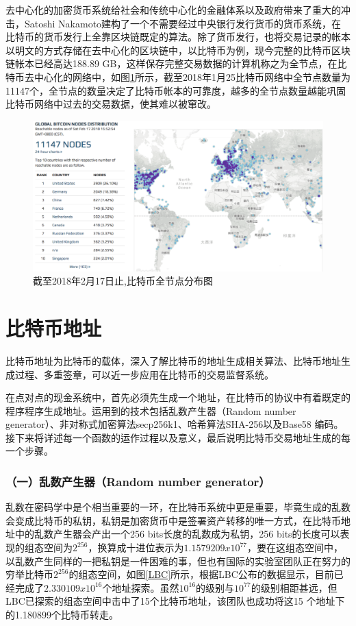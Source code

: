 		去中⼼化的加密货币系统给社会和传统中⼼化的⾦融体系以及政府带来了重⼤的冲击，Satoshi Nakamoto建构了一个不需要经过中央银行发行货币的货币系统，在比特币的货币发行上全靠区块链既定的算法。除了货币发行，也将交易记录的帐本以明文的方式存储在去中心化的区块链中，以比特币为例，现今完整的比特币区块链帐本已经高达188.89 GB，这样保存完整交易数据的计算机称之为全节点，在比特币去中心化的网络中，如图\ref{bitcoinfullnode}所示，截至2018年1月25比特币网络中全节点数量为11147个\supercite{bitcoinfullnode}，全节点的数量决定了比特币帐本的可靠度，越多的全节点数量越能巩固⽐特币网络中过去的交易数据，使其难以被窜改。

		\begin{figure}
			\centering
			\includegraphics[width = .9\textwidth]{bitcoinfullnode.pdf}
			\caption{截至2018年2月17日止,⽐特币全节点分布图\supercite{bitcoinfullnode}}\label{bitcoinfullnode}
		\end{figure}


		\section{比特币地址}
		⽐特币地址为⽐特币的载体，深⼊了解⽐特币的地址⽣成相关算法、⽐特币地址⽣成过程、多重签章，可以近⼀步应⽤在比特币的交易监督系统。
		
		在点对点的现金系统中，首先必须先生成一个地址，在比特币的协议中有着既定的程序程序生成地址。运用到的技术包括乱数产生器（Random number generator）、非对称式加密算法secp256k1\supercite{johnson2001elliptic}、哈希算法SHA-256\supercite{DBLP:conf/fse/KhovratovichRS12}以及Base58 编码\supercite{Base58}。接下来将详述每一个函数的运作过程以及意义，最后说明比特币交易地址生成的每一个步骤。
			
				\subsubsection{（一）乱数产生器（Random number generator）}
				乱数在密码学中是个相当重要的一环，在比特币系统中更是重要，毕竟生成的乱数会变成比特币的私钥，私钥是加密货币中是签署资产转移的唯一方式，在比特币地址中的乱数产生器会产出一个256 bits长度的乱数成为私钥，256 bits的长度可以表现的组态空间为$2^{256}$，换算成十进位表示为$1.1579209x10^{77}$，要在这组态空间中，以乱数产生同样的一把私钥是一件困难的事，但也有国际的实验室\supercite{TheLargeBitcoinCollider}团队正在努力的穷举比特币$2^{256}$的组态空间，如图\ref{LBC}所示，根据LBC公布的数据显示，目前已经完成了$2.330109x10^{16}$个地址探索。虽然$10^{16}$的级别与$10^{77}$的级别相距甚远，但LBC已探索的组态空间中击中了15个比特币地址，该团队也成功将这15 个地址下的1.180899个比特币转走。

